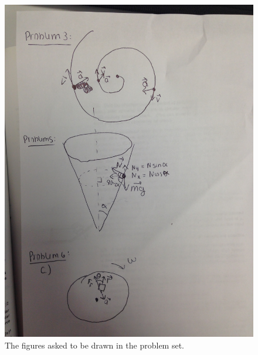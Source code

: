 \documentclass[11pt]{amsart}
\begin{document}
\begin{figure}[htb]
\includegraphics[width=1.4\textwidth,angle=270]{ps2.JPG}
\caption{The figures asked to be drawn in the problem set.}
\label{ps2}
\end{figure}
\end{document}
